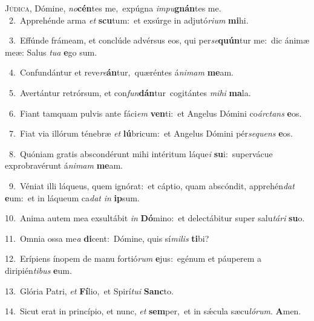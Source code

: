 \lettrine{\initial\textcolor{\initialcolor}{J}}{údica,} Dómine, \textit{no}\-\textbf{cén}tes me,~\star expúgna \textit{im}\-\textit{pu}\textbf{gnán}tes me.\\
{\numbfont\textcolor{\numbcolor}{~2.}}~Apprehénde arma \textit{et} \textbf{scu}\-tum:~\star et exsúrge in adjutó\-\textit{ri}\-\textit{um} \textbf{mi}\-hi.\par
{\numbfont\textcolor{\numbcolor}{~3.}}~Effúnde frámeam, et conclúde advérsus eos, qui per\-\textit{se}\-\textbf{quún}tur me:~\star dic ánimæ meæ: Salus \textit{tu}\-\textit{a} \textbf{e}\-go sum.\par
{\numbfont\textcolor{\numbcolor}{~4.}}~Confundántur et reve\-\textit{re}\-\textbf{án}tur,~\star quæréntes á\-\textit{ni}\-\textit{mam} \textbf{me}\-am.\par
{\numbfont\textcolor{\numbcolor}{~5.}}~Avertántur retrórsum, et con\-\textit{fun}\-\textbf{dán}tur~\star cogitántes \textit{mi}\-\textit{hi} \textbf{ma}\-la.\par
{\numbfont\textcolor{\numbcolor}{~6.}}~Fiant tamquam pulvis ante fáci\textit{em} \textbf{ven}\-ti:~\star et Angelus Dómini co\-\textit{árc}\-\textit{tans} \textbf{e}\-os.\par
{\numbfont\textcolor{\numbcolor}{~7.}}~Fiat via illórum ténebræ \textit{et} \textbf{lú}\-bricum:~\star et Angelus Dómini pér\-\textit{se}\-\textit{quens} \textbf{e}\-os.\par
{\numbfont\textcolor{\numbcolor}{~8.}}~Quóniam gratis abscondérunt mihi intéritum láque\textit{i} \textbf{su}\-i:~\star supervácue exprobravérunt á\-\textit{ni}\-\textit{mam} \textbf{me}\-am.\par
{\numbfont\textcolor{\numbcolor}{~9.}}~Véniat illi láqueus, quem ignórat:~\dagger et cáptio, quam abscóndit, apprehén\textit{dat} \textbf{e}\-um:~\star et in láqueum ca\textit{dat} \textit{in} \textbf{ip}\-sum.\par
{\numbfont\textcolor{\numbcolor}{10.}}~Anima autem mea exsultábit \textit{in} \textbf{Dó}\-mino:~\star et delectábitur super salu\-\textit{tá}\-\textit{ri} \textbf{su}\-o.\par
{\numbfont\textcolor{\numbcolor}{11.}}~Omnia ossa me\textit{a} \textbf{di}\-cent:~\star Dómine, quis sí\-\textit{mi}\-\textit{lis} \textbf{ti}\-bi?\par
{\numbfont\textcolor{\numbcolor}{12.}}~Erípiens ínopem de manu fortió\textit{rum} \textbf{e}\-jus:~\star egénum et páuperem a diripién\-\textit{ti}\-\textit{bus} \textbf{e}\-um.\par
{\numbfont\textcolor{\numbcolor}{13.}}~Glória Patri, \textit{et} \textbf{Fí}\-lio,~\star et Spirí\-\textit{tu}\-\textit{i} \textbf{Sanc}\-to.\par
{\numbfont\textcolor{\numbcolor}{14.}}~Sicut erat in princípio, et nunc, \textit{et} \textbf{sem}\-per,~\star et in sǽcula sæcu\-\textit{ló}\-\textit{rum}. \textbf{A}\-men.\par
